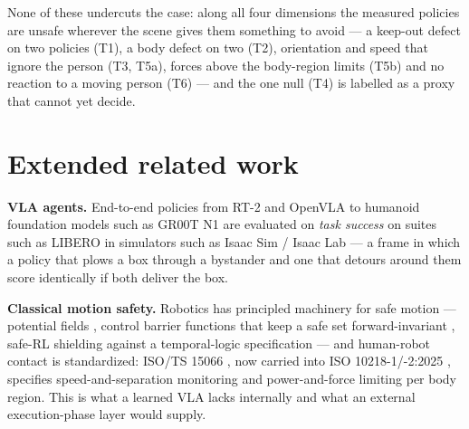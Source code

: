 \documentclass{article}
\begin{document}
None of these undercuts the case: along all four dimensions the measured policies are unsafe wherever the scene gives them something to avoid --- a keep-out defect on two policies (T1), a body defect on two (T2), orientation and speed that ignore the person (T3, T5a), forces above the body-region limits (T5b) and no reaction to a moving person (T6) --- and the one null (T4) is labelled as a proxy that cannot yet decide.
\FloatBarrier%
\section{Extended related work}


\textbf{VLA agents.} End-to-end policies from RT-2 \citep{ref3} and OpenVLA \citep{ref4} to humanoid foundation models such as GR00T N1 \citep{ref5} are evaluated on \emph{task success} on suites such as LIBERO \citep{ref6} in simulators such as Isaac Sim / Isaac Lab \citep{ref7,ref14} --- a frame in which a policy that plows a box through a bystander and one that detours around them score identically if both deliver the box.

\textbf{Classical motion safety.} Robotics has principled machinery for safe motion --- potential fields \citep{ref8}, control barrier functions that keep a safe set forward-invariant \citep{ref9}, safe-RL shielding against a temporal-logic specification \citep{ref10} --- and human-robot contact is standardized: ISO/TS 15066 \citep{ref11}, now carried into ISO 10218-1/-2:2025 \citep{ref35,ref36}, specifies speed-and-separation monitoring and power-and-force limiting per body region. This is what a learned VLA lacks internally and what an external execution-phase layer would supply.
\end{document}
